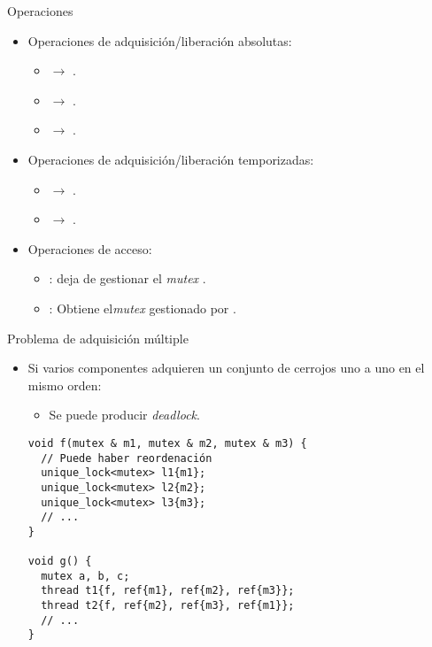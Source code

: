 \begin{frame}{Operaciones}
\begin{itemize}
  \item Operaciones de adquisición/liberación absolutas:
    \begin{itemize}
      \item {} $\rightarrow$ .
      \item {} $\rightarrow$ .
      \item {} $\rightarrow$ .
    \end{itemize}
  \item Operaciones de adquisición/liberación temporizadas:
    \begin{itemize}
      \item {} $\rightarrow$ .
      \item {} $\rightarrow$ .
    \end{itemize}
  \item Operaciones de acceso:
    \begin{itemize}
      \item {}:  deja de gestionar el \emph{mutex} .
      \item {}: Obtiene el\emph{mutex}  gestionado por .
    \end{itemize}
\end{itemize}
\end{frame}

\begin{frame}[fragile]{Problema de adquisición múltiple}
\begin{itemize}
  \item Si varios componentes adquieren un conjunto de cerrojos uno a uno en el mismo orden:
    \begin{itemize}
      \item Se puede producir \emph{deadlock}.
    \end{itemize}
\begin{lstlisting}
void f(mutex & m1, mutex & m2, mutex & m3) {
  // Puede haber reordenación
  unique_lock<mutex> l1{m1};
  unique_lock<mutex> l2{m2};
  unique_lock<mutex> l3{m3};
  // ...
}

void g() {
  mutex a, b, c;
  thread t1{f, ref{m1}, ref{m2}, ref{m3}};
  thread t2{f, ref{m2}, ref{m3}, ref{m1}};
  // ...
}
\end{lstlisting}
\end{itemize}
\end{frame}

